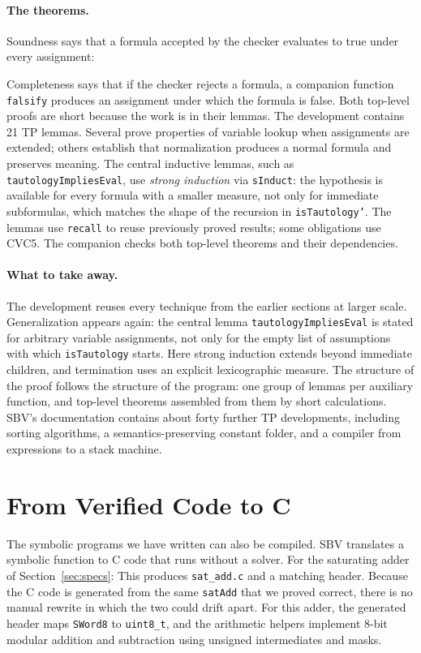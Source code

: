 \documentclass[acmsmall,screen,review,anonymous,nonacm]{acmart}
\newcommand{\code}[1]{\texttt{#1}}
\newcommand{\libsnippet}[1]{\par\noindent
  \begin{minipage}{\linewidth}
  
  \end{minipage}\par}
\begin{document}
\paragraph{The theorems.}
Soundness says that a formula accepted by the checker evaluates to true under
every assignment:
\libsnippet{tautSoundness}
Completeness says that if the checker rejects a formula, a companion function
\code{falsify} produces an assignment under which the formula is false.
Both top-level proofs are short because the work is in their lemmas. The
development contains 21 TP lemmas. Several prove properties of variable lookup
when assignments are extended; others establish that normalization produces a
normal formula and preserves meaning. The central inductive lemmas, such as
\code{tautologyImpliesEval}, use \emph{strong induction} via \code{sInduct}:
the hypothesis is available for every formula with a smaller measure, not only
for immediate subformulas, which matches the shape of the recursion in
\code{isTautology'}. The lemmas use \code{recall} to reuse previously proved
results; some obligations use CVC5. The companion checks both top-level
theorems and their dependencies.

\paragraph{What to take away.}
The development reuses every technique from the earlier sections at larger
scale. Generalization appears again: the central lemma \code{tautologyImpliesEval} is
stated for arbitrary variable assignments, not only for the empty list of
assumptions with which \code{isTautology} starts. Here strong induction extends
beyond immediate children, and termination uses an explicit lexicographic measure.
The structure
of the proof follows the structure of the program: one group of lemmas per
auxiliary function, and top-level theorems assembled from them by short
calculations. SBV's documentation contains about forty further TP developments,
including sorting algorithms, a semantics-preserving constant folder, and a
compiler from expressions to a stack machine.

\section{From Verified Code to C}
\label{sec:codegen}

The symbolic programs we have written can also be compiled. SBV translates a
symbolic function to C code that runs without a solver. For the saturating adder
of Section~\ref{sec:specs}:
This produces \code{sat\_add.c} and a matching header. Because the C code is
generated from the same \code{satAdd} that we proved correct, there is no manual
rewrite in which the two could drift apart. For this adder, the generated header
maps \code{SWord8} to \code{uint8\_t}, and the arithmetic helpers implement
8-bit modular addition and subtraction using unsigned intermediates and masks.
\end{document}
